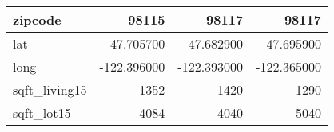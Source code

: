 \begin{table}[H]
\begin{tabular}{|l|r|r|r|}
\hline zipcode & \cellcolor[rgb]{0.9, 0.54, 0.52} 98115 & 98117 & 98117 \\
\hline lat & \cellcolor[rgb]{0.9, 0.54, 0.52} 47.705700 & 47.682900 & 47.695900 \\
\hline long & \cellcolor[rgb]{0.9, 0.54, 0.52} -122.396000 & \cellcolor[rgb]{0.9, 0.54, 0.52} -122.393000 & \cellcolor[rgb]{0.9, 0.54, 0.52} -122.365000 \\
\hline sqft\_living15 & \cellcolor[rgb]{0.9, 0.54, 0.52} 1352 & 1420 & 1290 \\
\hline sqft\_lot15 & \cellcolor[rgb]{0.9, 0.54, 0.52} 4084 & 4040 & 5040 \\
\hline
\end{tabular}
\end{table}
